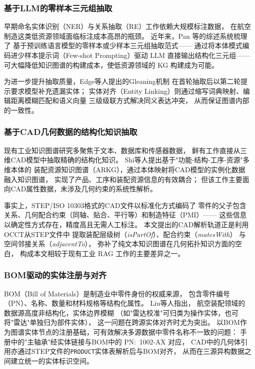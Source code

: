 \subsubsection{基于LLM的零样本三元组抽取}

早期命名实体识别（NER）与关系抽取（RE）工作依赖大规模标注数据，
在航空制造这类低资源领域面临标注成本高昂的瓶颈。
近年来，Pan 等\cite{pan2024kgllmsurvey}的综述系统梳理了
基于预训练语言模型的零样本或少样本三元组抽取范式——
通过将本体模式编码进少样本提示词（Few-shot Prompting）驱动 LLM 直接输出结构化三元组——
可大幅降低知识图谱的构建成本，使低资源领域的 KG 构建成为可能。

为进一步提升抽取质量，Edge等人\cite{edge2024graphrag}提出的Gleaning机制
在首轮抽取后以第二轮提示要求模型补充遗漏实体；
实体对齐（Entity Linking）则通过缩写词典映射、编辑距离模糊匹配和语义向量
三级级联方式\cite{wu2020corefresolution}解决同义表达冲突，
从而保证图谱内部的一致性。

\subsubsection{基于CAD几何数据的结构化知识抽取}

现有工业知识图谱研究多聚焦于文本、数据库和传感器数据，
鲜有工作直接从三维CAD模型中抽取精确的结构化知识。
Shi等人\cite{shi2022arkg}提出基于"功能-结构-工序-资源"多维本体的
装配资源知识图谱（ARKG），通过本体映射将CAD模型的实例化数据融入知识图谱，
实现了产品、工序和装配资源信息的有效耦合；
但该工作主要面向CAD属性数据，未涉及几何约束的系统性解析。

事实上，STEP/ISO 10303\cite{srinivasan2017bom}格式的CAD文件以标准化方式编码了
零件的父子包含关系、几何配合约束（同轴、贴合、平行等）和制造特征（PMI）——
这些信息以确定性方式存在，精度高且无需人工标注。
本文提出的CAD解析轨道正是利用OCCT从STEP文件中
提取装配层级树（\textit{isPartOf}）、配合约束（\textit{matesWith}）
与空间邻接关系（\textit{adjacentTo}），
弥补了纯文本知识图谱在几何拓扑知识方面的空白，
构成本文相较于现有工业 RAG 工作的主要差异之一。

\subsubsection{BOM驱动的实体注册与对齐}

BOM（Bill of Materials）是制造业中零件身份的权威来源，
包含零件编号（PN）、名称、数量和材料规格等结构化属性\cite{srinivasan2017bom}。
Liu等人\cite{liu2023avkg}指出，
航空装配领域的数据源高度非结构化，实体边界模糊
（如"雷达校准"可归类为操作实体，也可将"雷达"单独归为部件实体），
这一问题在跨源实体对齐时尤为突出。
以BOM作为图谱实体节点的注册基础，可有效解决多源数据中零件名称不一致的问题：
手册中的"主轴承"经实体链接与BOM中的 PN:~1002-AX 对应，
CAD中的几何体引用亦通过STEP文件的\texttt{PRODUCT}实体表解析后与BOM对齐，
从而在三源异构数据之间建立统一的实体标识空间。

